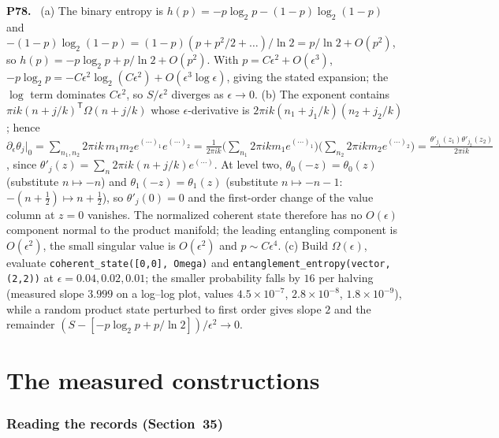 \documentclass[11pt]{article}
\newenvironment{solution}[1]{\medskip\noindent\textbf{P#1.}\ }{\par\medskip}
\begin{document}
\begin{solution}{78}
(a) The binary entropy is $h(p) = -p\log_2p-(1-p)\log_2(1-p)$ and
$-(1-p)\log_2(1-p) = (1-p)(p+p^2/2+\dots)/\ln2 = p/\ln2+O(p^2)$, so
$h(p) = -p\log_2p+p/\ln2+O(p^2)$. With $p = C\epsilon^2+O(\epsilon^3)$,
$-p\log_2p = -C\epsilon^2\log_2(C\epsilon^2)+O(\epsilon^3\log\epsilon)$, giving
the stated expansion; the $\log$ term dominates $C\epsilon^2$, so $S/\epsilon^2$
diverges as $\epsilon\to0$. (b) The exponent contains
$\pi ik(n+j/k)^{\mathsf T}\Omega(n+j/k)$ whose $\epsilon$-derivative is
$2\pi ik(n_1+j_1/k)(n_2+j_2/k)$; hence
$\partial_\epsilon\theta_j|_0 = \sum_{n_1,n_2}2\pi ik\,m_1m_2e^{(\cdots)_1}e^{(\cdots)_2}
= \frac{1}{2\pi ik}\Big(\sum_{n_1}2\pi ikm_1e^{(\cdots)_1}\Big)\Big(\sum_{n_2}2\pi ikm_2e^{(\cdots)_2}\Big)
= \frac{\theta'_{j_1}(z_1)\theta'_{j_2}(z_2)}{2\pi ik}$, since $\theta'_j(z) = \sum_n2\pi ik(n+j/k)e^{(\cdots)}$.
At level two, $\theta_0(-z) = \theta_0(z)$ (substitute $n\mapsto-n$) and
$\theta_1(-z) = \theta_1(z)$ (substitute $n\mapsto-n-1$: $-(n+\tfrac12)\mapsto n+\tfrac12$),
so $\theta'_j(0) = 0$ and the first-order change of the value column at
$z = 0$ vanishes. The normalized coherent state therefore has no
$O(\epsilon)$ component normal to the product manifold; the leading
entangling component is $O(\epsilon^2)$, the small singular value is
$O(\epsilon^2)$ and $p\sim C\epsilon^4$. (c) Build $\Omega(\epsilon)$, evaluate
\texttt{coherent\_state([0,0], Omega)} and
\texttt{entanglement\_entropy(vector, (2,2))} at $\epsilon = 0.04,0.02,0.01$;
the smaller probability falls by $16$ per halving (measured slope $3.999$ on a
log--log plot, values $4.5\times10^{-7}$, $2.8\times10^{-8}$, $1.8\times10^{-9}$),
while a random product state perturbed to first order gives slope $2$ and
the remainder $(S-[-p\log_2p+p/\ln2])/\epsilon^2\to0$.
\end{solution}

\part*{The measured constructions}

\section*{Reading the records (Section~35)}
\end{document}
